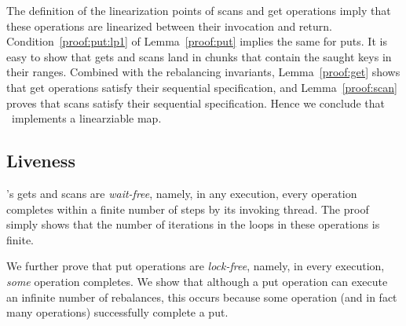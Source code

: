 The definition of the linearization points of scans and get operations imply that these operations are linearized between their invocation and return.
Condition~\ref{proof:put:lp1} of Lemma~\ref{proof:put} implies the same for puts. 
It is easy to show that gets and scans land in chunks that contain the saught keys in their ranges. Combined with the rebalancing invariants,
Lemma~\ref{proof:get} shows that get operations satisfy their sequential specification, and Lemma~\ref{proof:scan} proves that scans satisfy their sequential specification. 
Hence we conclude that \kiwi\ implements a linearziable map. 


\subsection{Liveness}
\label{sec:live}

 {\kiwi}'s gets and scans are \emph{wait-free}, namely, in any execution, every operation completes within a finite number of steps by its invoking thread. The proof simply shows that the number of iterations in the loops in these operations is finite. 

We further prove that put operations are \emph{lock-free}, namely, in every execution, \emph{some} operation completes. We show that although a put operation can execute an infinite number of rebalances, this occurs because 
some operation (and in fact many operations) successfully complete a put.

